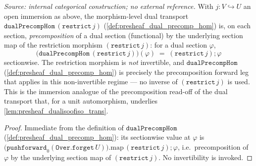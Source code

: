\begin{lemma}\leanok
  \label{lem:dual_precomp_hom_restrict_apply}
  \textit{Source: internal categorical construction; no external reference.}
  With \(j : V \hookrightarrow U\) an open immersion as above, the morphism-level dual transport
  \(\mathtt{dualPrecompHom}\,(\mathtt{restrict}\,j)\) (\cref{def:presheaf_dual_precomp_hom}) is, on
  each section, \emph{precomposition} of a dual section (functional) by the underlying section map of
  the restriction morphism \((\mathtt{restrict}\,j)\): for a dual section \(\varphi\),
  \[
    \bigl(\mathtt{dualPrecompHom}\,(\mathtt{restrict}\,j)\bigr)(\varphi)
      \;=\; (\mathtt{restrict}\,j) \mathbin{;} \varphi
  \]
  sectionwise. The restriction morphism is \emph{not} invertible, and
  \(\mathtt{dualPrecompHom}\) (\cref{def:presheaf_dual_precomp_hom}) is precisely the precomposition
  forward leg that applies in this non-invertible regime --- no inverse of \((\mathtt{restrict}\,j)\)
  is used. This is the immersion analogue of the precomposition read-off of the dual transport that,
  for a unit automorphism, underlies \cref{lem:presheaf_dualisoofiso_trans}.
\end{lemma}
\begin{proof}
  \leanok
  Immediate from the definition of \(\mathtt{dualPrecompHom}\)
  (\cref{def:presheaf_dual_precomp_hom}): its sectionwise value at \(\varphi\) is
  \(\bigl(\mathtt{pushforward}_0(\mathtt{Over.forget}\,U)\bigr).\mathrm{map}\,(\mathtt{restrict}\,j)
  \mathbin{;} \varphi\), i.e.\ precomposition of \(\varphi\) by the underlying section map of
  \((\mathtt{restrict}\,j)\). No invertibility is invoked.
\end{proof}

